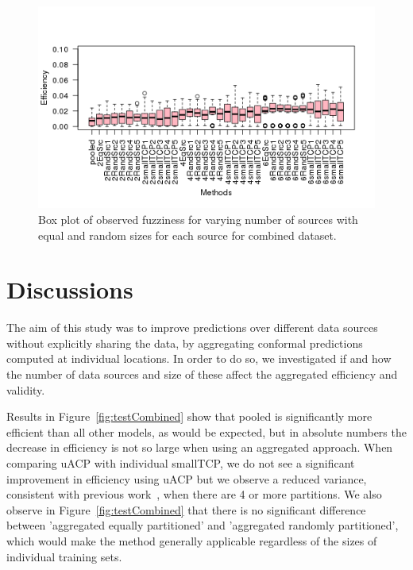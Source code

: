 \documentclass[main]{subfiles}
\begin{document}
\begin{figure}[H]
\begin{center}


 
  \includegraphics[scale=0.8]{images/boxplotCombined_eff}
\caption{Box plot of observed fuzziness for varying number of sources with equal and random sizes for each source for combined dataset.}\label{fig:boxplotCombined}
\end{center}
\end{figure}




\section{Discussions}
The aim of this study was to improve predictions over different data sources without explicitly sharing the data, by aggregating conformal predictions computed at individual locations. In order to do so, we investigated if and how the number of data sources and size of these affect the aggregated efficiency and validity.

Results in Figure~\ref{fig:testCombined} show that pooled is significantly more efficient than all other models, as would be expected, but in absolute numbers the decrease in efficiency is not so large when using an aggregated approach. When comparing uACP with individual smallTCP, we do not see a significant improvement in efficiency using uACP but we observe a reduced variance, consistent with previous work~\cite{Carlsson:2014qr}, when there are 4 or more partitions. We also observe in Figure~\ref{fig:testCombined} that there is no significant difference between 'aggregated equally partitioned' and 'aggregated randomly partitioned', which would make the method generally applicable regardless of the sizes of individual training sets.
\end{document}

